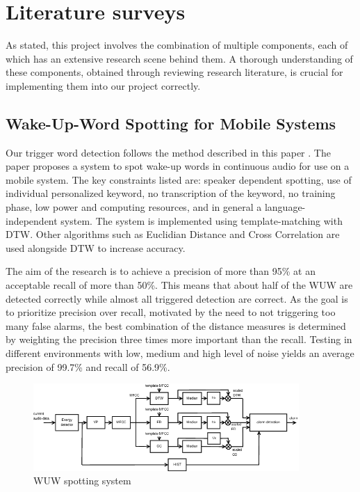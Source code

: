 \chapter{Literature surveys}
As stated, this project involves the combination of multiple components, each of which has an extensive research scene behind them. A thorough understanding of  these components, obtained through reviewing research literature, is crucial for implementing them into our project correctly. 

\section{Wake-Up-Word Spotting for Mobile Systems\cite{wuwmobile}}
Our trigger word detection follows the method described in this paper . The paper proposes a system to spot wake-up words in continuous audio for use on a mobile system. The key constraints listed are:  speaker dependent spotting, use of individual personalized keyword, no transcription of the keyword, no training phase, low power and computing resources, and in general a language-independent system. The system is implemented using template-matching  with DTW. Other algorithms such as Euclidian Distance and Cross Correlation are used alongside DTW to increase accuracy.

The aim of the research is to achieve a precision of more than 95\% at an acceptable recall of more than 50\%. This means that about half of the WUW are detected correctly while almost all triggered detection are correct. As the goal is to prioritize precision over recall, motivated by the need to  not triggering too many false alarms, the best combination of the distance measures is determined by weighting the precision three times more important than the recall. Testing in different environments with low, medium and high level of noise yields an average precision of 99.7\% and recall of 56.9\%.
\begin{figure}[h]
    \centering
    \includegraphics[width = 0.9\textwidth]{img/WUW-spotting-system.png}
    \caption{WUW spotting system}
    \label{fig:lr1l}
\end{figure}
